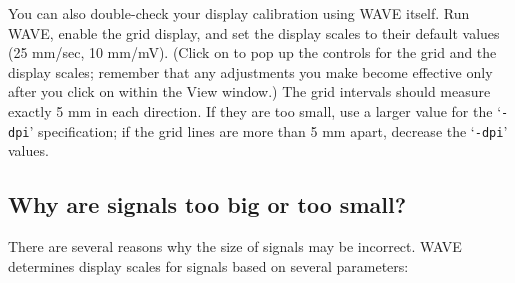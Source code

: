 \documentclass[twoside]{book}
\newcommand{\button}[1]{\cornersize{2}\ovalbox{\rule[-.3mm]{0cm}{2.5mm}\small\sf ~#1~}}
\newcommand{\WAVE}{{\sf WAVE}\xspace}
\begin{document}
You can also double-check your display calibration using \WAVE{} itself.
Run \WAVE{}, enable the grid display, and set the display scales to
their default values (25 mm/sec, 10 mm/mV).  (Click on
\button{View...} to pop up the controls for the grid and the display
scales; remember that any adjustments you make become effective only
after you click on \button{Redraw} within the {\sf View} window.)  The
grid intervals should measure exactly 5 mm in each direction.  If they
are too small, use a larger value for the `{\tt -dpi}' specification; if the
grid lines are more than 5 mm apart, decrease the `{\tt -dpi}' values.

\subsection{Why are signals too big or too small?}

There are several reasons why the size of signals may be incorrect.  \WAVE{}
determines display scales for signals based on several parameters:
\end{document}
